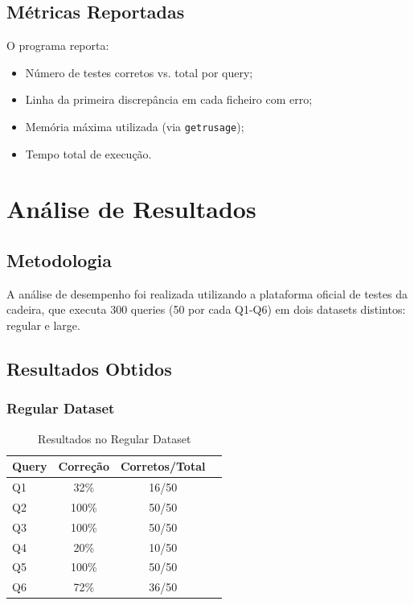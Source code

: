 \documentclass[a4paper,12pt]{scrreprt}
\begin{document}
\section{Métricas Reportadas}

O programa reporta:
\begin{itemize}
    \item Número de testes corretos vs. total por query;
    \item Linha da primeira discrepância em cada ficheiro com erro;
    \item Memória máxima utilizada (via \texttt{getrusage});
    \item Tempo total de execução.
\end{itemize}

\chapter{Análise de Resultados}

\section{Metodologia}

A análise de desempenho foi realizada utilizando a plataforma oficial de testes da cadeira, que executa 300 queries (50 por cada Q1-Q6) em dois datasets distintos: regular e large.

\section{Resultados Obtidos}

\subsection{Regular Dataset}

\begin{table}[H]
\centering
\begin{tabular}{|l|c|c|c|}
\hline
\textbf{Query} & \textbf{Correção} & \textbf{Corretos/Total} \\
\hline
Q1 & 32\% & 16/50 \\
\hline
Q2 & 100\% & 50/50 \\
\hline
Q3 & 100\% & 50/50 \\
\hline
Q4 & 20\% & 10/50 \\
\hline
Q5 & 100\% & 50/50 \\
\hline
Q6 & 72\% & 36/50 \\
\hline
\end{tabular}
\caption{Resultados no Regular Dataset}
\end{table}
\end{document}
